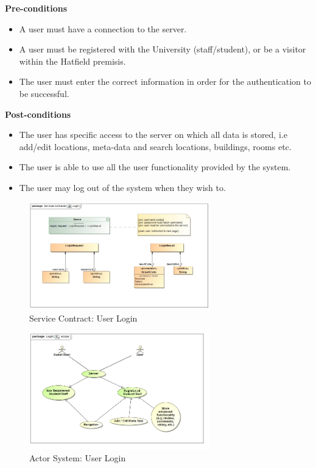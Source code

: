 \documentclass[runningheads,a4paper]{article}
\begin{document}
  
\textbf{Pre-conditions}
\begin{itemize}
 	\item A user must have a connection to the server.
  	\item A user must be registered with the University (staff/student), or be a visitor within the Hatfield premisis.
  	\item The user must enter the correct information in order for the authentication to be successful.
\end{itemize}
  
\textbf{Post-conditions}
\begin{itemize}
  	\item The user has specific access to the server on which all data is stored, i.e add/edit locations, meta-data and search locations, buildings, rooms etc.
  	\item The user is able to use all the user functionality provided by the system. 
  	\item The user may log out of the system when they wish to.
\end{itemize}
  
\begin{figure}[H]
  	\centering
  		\includegraphics[width=0.7\textwidth]{LoginServicesContract.jpg}
  	\caption{Service Contract: User Login}
\end{figure}
\begin{figure}[H]
   	\centering
   	\includegraphics[width=0.7\textwidth]{LoginActorSystem.jpg}
   	\caption{Actor System: User Login}
\end{figure}
  
\end{document}
